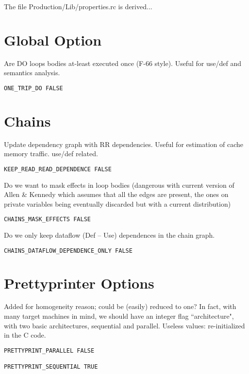 The file Production/Lib/properties.rc is derived...

\section{Global Option}

Are DO loops bodies at-least executed once (F-66 style).
Useful for use/def and semantics analysis.

\begin{verbatim}
ONE_TRIP_DO FALSE
\end{verbatim}

\section{Chains}

Update dependency graph with RR dependencies.
Useful for estimation of cache memory traffic. use/def related.

\begin{verbatim}
KEEP_READ_READ_DEPENDENCE FALSE
\end{verbatim}

Do we want to mask effects in loop bodies (dangerous with current
version of Allen \& Kennedy which assumes that all the edges are
present, the ones on private variables being eventually discarded
but with a current distribution)

\begin{verbatim}
CHAINS_MASK_EFFECTS FALSE
\end{verbatim}

Do we only keep dataflow (Def -- Use) dependences in the chain graph.

\begin{verbatim}
CHAINS_DATAFLOW_DEPENDENCE_ONLY FALSE
\end{verbatim}

\section{Prettyprinter Options}

Added for homogeneity reason; could be (easily) reduced to one?  In
fact, with many target machines in mind, we should have an integer flag
``architecture", with two basic architectures, sequential and parallel.
Useless values: re-initialized in the C code.

\begin{verbatim}
PRETTYPRINT_PARALLEL FALSE

PRETTYPRINT_SEQUENTIAL TRUE
\end{verbatim}

